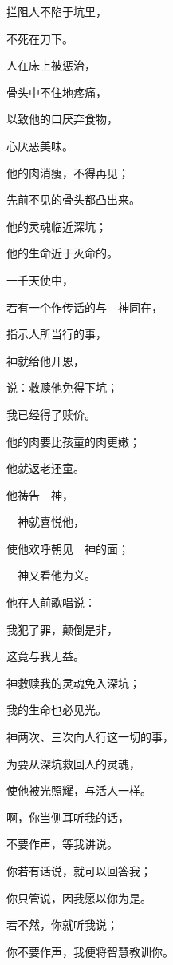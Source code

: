 {\par }{\Q {}拦阻人不陷于坑里，
\par }{\Q 不死在刀下。
\par }{\BB \par }{\Q {}人在床上被惩治，
\par }{\Q 骨头中不住地疼痛，
\par }{\Q {}以致他的口厌弃食物，
\par }{\Q 心厌恶美味。
\par }{\Q {}他的肉消瘦，不得再见；
\par }{\Q 先前不见的骨头都凸出来。
\par }{\Q {}他的灵魂临近深坑；
\par }{\Q 他的生命近于灭命的。
\par }{\Q {}一千天使中，
\par }{\Q 若有一个作传话的与　神同在，
\par }{\Q 指示人所当行的事，
\par }{\Q {}神就给他开恩，
\par }{\Q 说：救赎他免得下坑；
\par }{\Q 我已经得了赎价。
\par }{\Q {}他的肉要比孩童的肉更嫩；
\par }{\Q 他就返老还童。
\par }{\Q {}他祷告　神，
\par }{\Q 　神就喜悦他，
\par }{\Q 使他欢呼朝见　神的面；
\par }{\Q 　神又看他为义。
\par }{\Q {}他在人前歌唱说：
\par }{\Q 我犯了罪，颠倒是非，
\par }{\Q 这竟与我无益。
\par }{\Q {}神救赎我的灵魂免入深坑；
\par }{\Q 我的生命也必见光。
\par }{\BB \par }{\Q {}神两次、三次向人行这一切的事，
\par }{\Q {}为要从深坑救回人的灵魂，
\par }{\Q 使他被光照耀，与活人一样。
\par }{\Q {}啊，你当侧耳听我的话，
\par }{\Q 不要作声，等我讲说。
\par }{\Q {}你若有话说，就可以回答我；
\par }{\Q 你只管说，因我愿以你为是。
\par }{\Q {}若不然，你就听我说；
\par }{\Q 你不要作声，我便将智慧教训你。

}

